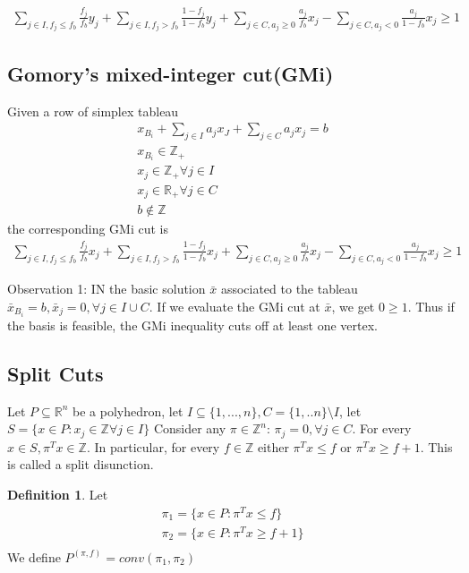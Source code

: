 \documentclass{article}
\theoremstyle{plain}
\theoremstyle{definition}
\newtheorem{defn}{Definition}
\begin{document}
\begin{align*}
    \sum_{j\in I, f_j \leq f_b}\frac{f_j}{f_b} y_j
    + \sum_{j\in I, f_j > f_b}\frac{1 - f_j}{1 - f_b} y_j
    + \sum_{j\in C, a_j \geq 0}\frac{a_j}{f_b} x_j
    - \sum_{j\in C, a_j < 0}\frac{a_j}{1 - f_b}x_j \geq 1
\end{align*}

\subsection{Gomory's mixed-integer cut(GMi)}
Given a row of simplex tableau
\begin{gather*}
    x_{B_i} + \sum_{j\in I} a_jx_J + \sum_{j\in C}a_jx_j = b\\
    x_{B_i}\in\mathbb{Z}_+\\
    x_{j}\in\mathbb{Z}_+ \forall j\in I\\
    x_j\in\mathbb{R}_+ \forall j\in C\\
    b\not\in\mathbb{Z}
\end{gather*}
the corresponding GMi cut is
\begin{align*}
    \sum_{j\in I, f_j \leq f_b}\frac{f_j}{f_b}x_j
    + \sum_{j\in I, f_j > f_b}\frac{1-f_j}{1-f_b}x_j
    + \sum_{j\in C, a_j \geq 0}\frac{a_j}{f_b} x_j
    - \sum_{j\in C, a_j < 0}\frac{a_j}{1 - f_b}x_j \geq 1
\end{align*}

Observation 1: IN the basic solution $\bar{x}$ associated
to the tableau $\bar{x}_{B_i} = b, \bar{x}_j = 0, \forall j\in I \cup C$.
If we evaluate the GMi cut at $\bar{x}$, we get $0\geq 1$. Thus if the
basis is feasible, the GMi inequality cuts off at least one vertex.

\subsection{Split Cuts}
Let $P\subseteq \mathbb{R}^n$ be a polyhedron, let $I \subseteq \{1, ..., n\},
C = \{1,..n\}\setminus I$, let $S = \{x\in P: x_j\in\mathbb{Z} \forall j\in I\}$
Consider any $\pi\in\mathbb{Z}^n$: $\pi_j = 0, \forall j\in C$. For every
$x\in S, \pi^Tx\in\mathbb{Z}$. In particular, for every $f\in\mathbb{Z}$ either
$\pi^Tx\leq f$ or $\pi^Tx\geq f+1$. This is called a split disunction.

\begin{defn}
    Let
    \begin{align*}
        \pi_1 = \{x\in P: \pi^Tx\leq f\}\\
        \pi_2 = \{x\in P: \pi^Tx\geq f+1\}\\
    \end{align*}
    We define $P^{(\pi, f)} = conv(\pi_1, \pi_2)$
\end{defn}
\end{document}
